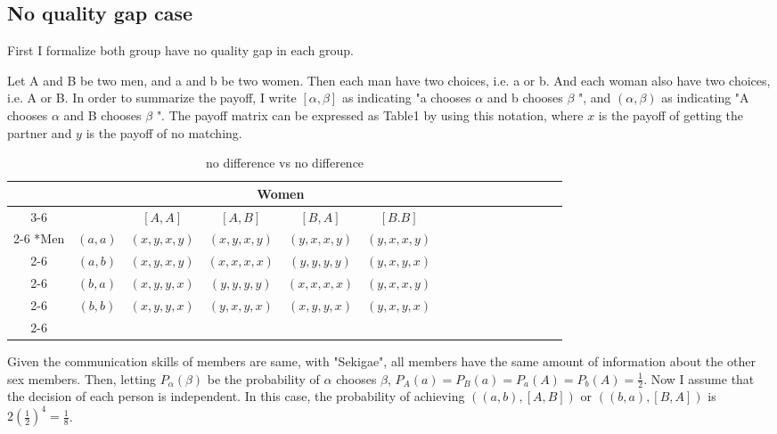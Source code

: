 \documentclass{article}
\begin{document}
	\subsection{No quality gap case}
	\par
	First I formalize both group have no quality gap in each group.
	\par
	Let A and B be two men, and a and b be two women. Then each man have two choices, i.e. a or b. And each woman also have two choices, i.e. A or B. In order to summarize the payoff, I write $[\alpha, \beta]$ as indicating "a chooses $\alpha$ and b chooses $\beta$ ", and $(\alpha, \beta)$ as indicating "A chooses $\alpha$ and B chooses $\beta$ ". The payoff matrix can be expressed as Table1 by using this notation, where $x$ is the payoff of getting the partner and $y$ is the payoff of no matching.
	\begin{table}[h]
	\begin{center}
                \setlength{\extrarowheight}{2pt}
                \begin{tabular}{*{16}{c|}}
                  \multicolumn{2}{c}{} & \multicolumn{1}{c}{} & \multicolumn{2}{c}{Women}\\\cline{3-6}
                  \multicolumn{1}{c}{} &  & $[A, A]$  & $[A, B]$ & $[B, A]$ & $[B.B]$\\\cline{2-6}
                  \multirow{4}*{Men}  & $(a,a)$ & $(x,y,x,y)$ & $(x,y,x,y)$ & $(y,x,x,y)$ & $(y,x,x,y)$\\\cline{2-6}
                  & $(a,b)$ & $(x,y,x,y)$ & $(x,x,x,x)$ & $(y,y,y,y)$ & $(y,x,y,x)$\\\cline{2-6}
                  & $(b,a)$ & $(x,y,y,x)$ & $(y,y,y,y)$ & $(x,x,x,x)$ & $(y,x,x,y)$\\\cline{2-6}
                  & $(b,b)$ & $(x,y,y,x)$ & $(y,x,y,x)$ & $(x,y,y,x)$ & $(y,x,y,x)$\\\cline{2-6}
                \end{tabular}
        \end{center}
        \caption{no difference vs no difference}
  	\end{table}
	\par
	Given the communication skills of members are same, with "Sekigae", all members have the same amount of information about the other sex members. Then, letting $P_\alpha(\beta)$ be the probability of $\alpha$ chooses $\beta$, $P_A(a)= P_B(a) = P_a(A) = P_b(A) = \frac{1}{2}$. Now I assume that the decision of each person is independent. In this case, the probability of achieving $\left( (a, b), [A, B] \right)$ or $\left( (b, a), [B, A] \right)$ is $2 \left(\frac{1}{2}\right)^4 = \frac{1}{8}$.
\end{document}
